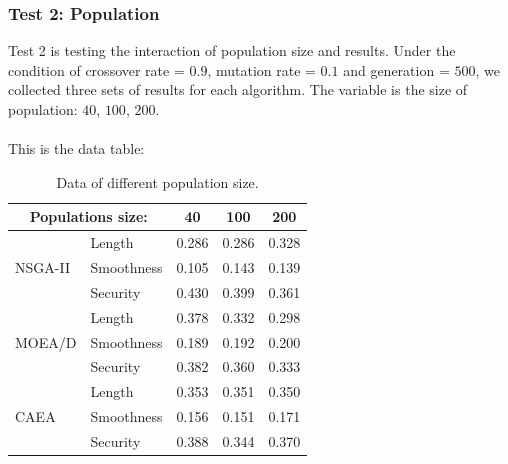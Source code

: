 \documentclass[a4paper, 11pt]{article}
\begin{document}
\subsubsection{Test 2: Population}
Test 2 is testing the interaction of population size and results.
Under the condition of crossover rate = $0.9$, mutation rate = $0.1$ and generation = $500$,
we collected three sets of results for each algorithm. The variable is the size of population:
$40$, $100$, $200$.\\
\\
This is the data table:
\clearpage
\begin{table}[htb]
  \centering
    \begin{tabular}{|l|l|c|c|c|}
    \hline
    \multicolumn{2}{|c|}{Populations size:}& 40 & 100 & 200\\
    \hline
    \multirow{3}{*}{NSGA-II}& Length & 0.286 & 0.286 & 0.328\\
                            & Smoothness & 0.105 & 0.143 & 0.139\\
                            & Security & 0.430 & 0.399 & 0.361\\
    \hline
    \multirow{3}{*}{MOEA/D} & Length & 0.378 & 0.332 & 0.298\\
                            & Smoothness & 0.189 & 0.192 & 0.200\\
                            & Security & 0.382 & 0.360 & 0.333\\
    \hline
    \multirow{3}{*}{CAEA}   & Length & 0.353 & 0.351 & 0.350\\
                            & Smoothness & 0.156 & 0.151 & 0.171\\
                            & Security & 0.388 & 0.344 & 0.370\\
    \hline
    \end{tabular}
  \caption{Data of different population size.}
\end{table}
\end{document}
